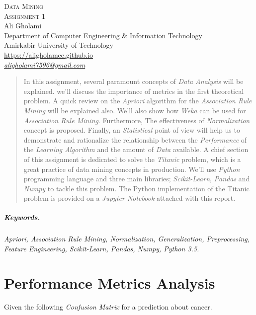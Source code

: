 \documentclass[12pt]{article}
\numberwithin{equation}{section}
\numberwithin{table}{section}
\numberwithin{figure}{section}
\begin{document}

\begin{center}
\textsc{\Huge Data Mining} \\[2pt]
	\textsc{\Large Assignment 1}\\
	\vspace{0.5cm}
  Ali Gholami \\[6pt]
  Department of Computer Engineering \& Information Technology\\
  Amirkabir University of Technology  \\[6pt]
  \def\UrlFont{\em}
  \url{https://aligholamee.github.io}\\
    \href{mailto:aligholami7596@gmail.com}{\textit{aligholami7596@gmail.com}}
\end{center}

\begin{abstract}
In this assignment, several paramount concepts of \textit{Data Analysis} will be explained. we'll discuss the importance of metrics in the first theoretical problem. A quick review on the \textit{Apriori} algorithm for the \textit{Association Rule Mining} will be explained also. We'll also show how \textit{Weka} can be used for \textit{Association Rule Mining}. Furthermore, The effectiveness of \textit{Normalization} concept is proposed. Finally, an \textit{Statistical} point of view will help us to demonstrate and rationalize the relationship between the \textit{Performance} of the \textit{Learning Algorithm} and the amount of \textit{Data} available. A chief section of this assignment is dedicated to solve the \textit{Titanic} problem, which is a great practice of data mining concepts in production. We'll use \textit{Python} programming language and three main libraries; \textit{Scikit-Learn}, \textit{Pandas} and \textit{Numpy} to tackle this problem. The Python implementation of the Titanic problem is provided on a \textit{Jupyter Notebook} attached with this report.
\end{abstract} 

\subparagraph{Keywords.} \textit{Apriori, Association Rule Mining, Normalization, Generalization, Preprocessing, Feature Engineering, Scikit-Learn, Pandas, Numpy, Python 3.5.}

\section{Performance Metrics Analysis}
Given the following \textit{Confusion Matrix} for a prediction about cancer.
\end{document}
